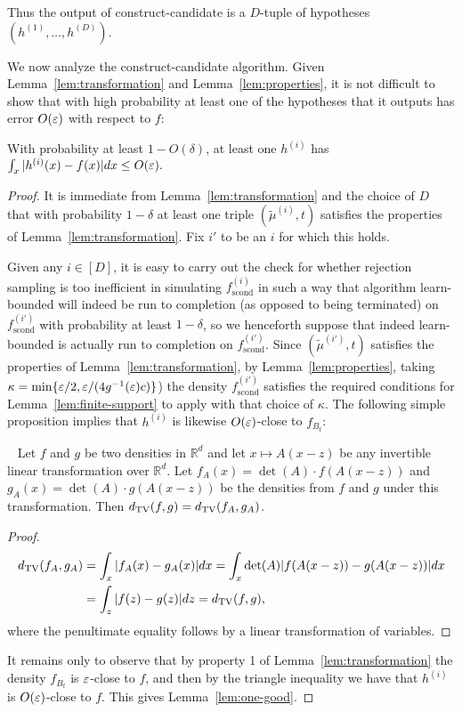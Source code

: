 Thus the output of \textsf{construct-candidate} is a $D$-tuple of hypotheses $({h}^{(1)},
\dots, {h}^{(D)}).$ 

\medskip

We now analyze the \textsf{construct-candidate} algorithm.  Given Lemma~\ref{lem:transformation} and Lemma~\ref{lem:properties}, it is not difficult to show that with high probability at least one of the hypotheses that it outputs has error $O(\varepsilon)$ with respect to $f$:

\begin{lemma} \label{lem:one-good}
With probability at least $1-O(\delta)$, at least one ${h}^{(i)}$ has $\int_x |{h}^{(i)}(x)-f(x)| dx \leq O(\varepsilon).$
\end{lemma}
\begin{proof}
It is immediate from Lemma~\ref{lem:transformation} and the choice of $D$ that with probability $1-\delta$ at least one
triple $(\tilde{\mu}^{(i)},t)$ satisfies the properties of Lemma~\ref{lem:transformation}.  
 Fix $i'$ to be an $i$ for which this holds.

Given any $i \in [D]$, it is easy to carry out the check for whether rejection sampling is too inefficient in simulating $f^{(i)}_{\mathrm{scond}}$ in such a way that algorithm \textsf{learn-bounded} will indeed be run to completion (as opposed to being terminated) on $f^{(i')}_{\mathrm{scond}}$ with probability at least $1-\delta$, so we henceforth suppose that indeed \textsf{learn-bounded} is actually run to completion on $f^{(i')}_{\mathrm{scond}}$. 
Since $(\tilde{\mu}^{(i')},t)$ satisfies the properties of Lemma~\ref{lem:transformation}, by Lemma~\ref{lem:properties}, taking 
$\kappa = \min\{\varepsilon{/2},\varepsilon/(4 g^{-1}(\varepsilon)c)\}$) the density $f^{(i')}_{\mathrm{scond}}$ satisfies  the required conditions for Lemma~\ref{lem:finite-support} to apply with that choice of $\kappa$.
The following simple proposition implies that ${h}^{(i)}$ is likewise $O(\varepsilon)$-close to $f_{B_{t}}$:

\begin{proposition}~\label{prop:density-diff-transform}
Let $f$ and $g$ be two densities in $\mathbb{R}^d$ and let $x \mapsto A(x-z)$ be any invertible linear transformation over $\mathbb{R}^d$. Let $f_A(x) = \det(A) \cdot f(A(x-z))$ and $g_A(x) = \det(A) \cdot g(A(x-z))$ be the densities from $f$ and $g$ under this transformation.  Then $d_\mathrm{TV}(f,g) = d_\mathrm{TV}(f_A, g_A)$. 
\end{proposition}
\begin{proof}
\begin{align*}
d_\mathrm{TV}(f_A,g_A) &= \int_{x} |f_A(x) - g_A(x)| dx = \int_x \det(A) |f(A(x-z)) - g(A(x-z)) | dx\\
& = \int_z |f(z) - g(z)| dz = d_\mathrm{TV}(f,g), 
\end{align*}
where the penultimate equality follows by a linear transformation of variables. 
\end{proof}

It remains only to observe that by property 1 of Lemma~\ref{lem:transformation} the density $f_{B_{t}}$ is $\varepsilon$-close to $f$, and then by the triangle inequality we have that ${h}^{(i)}$ is $O(\varepsilon)$-close to $f$.  This gives Lemma~\ref{lem:one-good}.
\end{proof}

